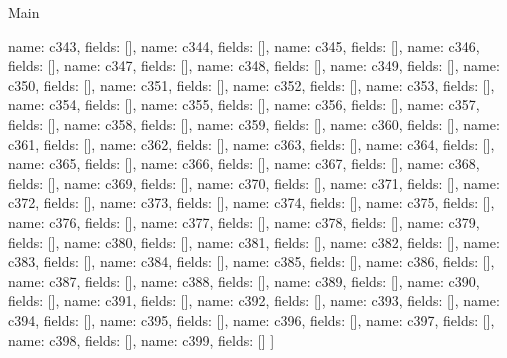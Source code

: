 \begin{lexlean}{Main}
\begin{semanticmodule}
{    {name: c343, fields: []},
    {name: c344, fields: []},
    {name: c345, fields: []},
    {name: c346, fields: []},
    {name: c347, fields: []},
    {name: c348, fields: []},
    {name: c349, fields: []},
    {name: c350, fields: []},
    {name: c351, fields: []},
    {name: c352, fields: []},
    {name: c353, fields: []},
    {name: c354, fields: []},
    {name: c355, fields: []},
    {name: c356, fields: []},
    {name: c357, fields: []},
    {name: c358, fields: []},
    {name: c359, fields: []},
    {name: c360, fields: []},
    {name: c361, fields: []},
    {name: c362, fields: []},
    {name: c363, fields: []},
    {name: c364, fields: []},
    {name: c365, fields: []},
    {name: c366, fields: []},
    {name: c367, fields: []},
    {name: c368, fields: []},
    {name: c369, fields: []},
    {name: c370, fields: []},
    {name: c371, fields: []},
    {name: c372, fields: []},
    {name: c373, fields: []},
    {name: c374, fields: []},
    {name: c375, fields: []},
    {name: c376, fields: []},
    {name: c377, fields: []},
    {name: c378, fields: []},
    {name: c379, fields: []},
    {name: c380, fields: []},
    {name: c381, fields: []},
    {name: c382, fields: []},
    {name: c383, fields: []},
    {name: c384, fields: []},
    {name: c385, fields: []},
    {name: c386, fields: []},
    {name: c387, fields: []},
    {name: c388, fields: []},
    {name: c389, fields: []},
    {name: c390, fields: []},
    {name: c391, fields: []},
    {name: c392, fields: []},
    {name: c393, fields: []},
    {name: c394, fields: []},
    {name: c395, fields: []},
    {name: c396, fields: []},
    {name: c397, fields: []},
    {name: c398, fields: []},
    {name: c399, fields: []}
  ]
}


\end{semanticmodule}
\end{lexlean}
